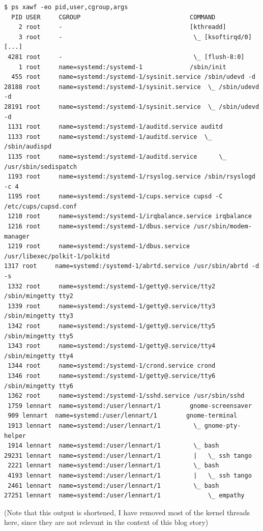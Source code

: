 \documentclass[titlepage]{article}
\begin{document}
\begin{lstlisting}
$ ps xawf -eo pid,user,cgroup,args
  PID USER     CGROUP                              COMMAND
    2 root     -                                   [kthreadd]
    3 root     -                                    \_ [ksoftirqd/0]
[...]
 4281 root     -                                    \_ [flush-8:0]
    1 root     name=systemd:/systemd-1             /sbin/init
  455 root     name=systemd:/systemd-1/sysinit.service /sbin/udevd -d
28188 root     name=systemd:/systemd-1/sysinit.service  \_ /sbin/udevd -d
28191 root     name=systemd:/systemd-1/sysinit.service  \_ /sbin/udevd -d
 1131 root     name=systemd:/systemd-1/auditd.service auditd
 1133 root     name=systemd:/systemd-1/auditd.service  \_ /sbin/audispd
 1135 root     name=systemd:/systemd-1/auditd.service      \_ /usr/sbin/sedispatch
 1193 root     name=systemd:/systemd-1/rsyslog.service /sbin/rsyslogd -c 4
 1195 root     name=systemd:/systemd-1/cups.service cupsd -C /etc/cups/cupsd.conf
 1210 root     name=systemd:/systemd-1/irqbalance.service irqbalance
 1216 root     name=systemd:/systemd-1/dbus.service /usr/sbin/modem-manager
 1219 root     name=systemd:/systemd-1/dbus.service /usr/libexec/polkit-1/polkitd
1317 root     name=systemd:/systemd-1/abrtd.service /usr/sbin/abrtd -d -s
 1332 root     name=systemd:/systemd-1/getty@.service/tty2 /sbin/mingetty tty2
 1339 root     name=systemd:/systemd-1/getty@.service/tty3 /sbin/mingetty tty3
 1342 root     name=systemd:/systemd-1/getty@.service/tty5 /sbin/mingetty tty5
 1343 root     name=systemd:/systemd-1/getty@.service/tty4 /sbin/mingetty tty4
 1344 root     name=systemd:/systemd-1/crond.service crond
 1346 root     name=systemd:/systemd-1/getty@.service/tty6 /sbin/mingetty tty6
 1362 root     name=systemd:/systemd-1/sshd.service /usr/sbin/sshd
 1759 lennart  name=systemd:/user/lennart/1        gnome-screensaver
 909 lennart  name=systemd:/user/lennart/1        gnome-terminal
 1913 lennart  name=systemd:/user/lennart/1         \_ gnome-pty-helper
 1914 lennart  name=systemd:/user/lennart/1         \_ bash
29231 lennart  name=systemd:/user/lennart/1         |   \_ ssh tango
 2221 lennart  name=systemd:/user/lennart/1         \_ bash
 4193 lennart  name=systemd:/user/lennart/1         |   \_ ssh tango
 2461 lennart  name=systemd:/user/lennart/1         \_ bash
27251 lennart  name=systemd:/user/lennart/1             \_ empathy
\end{lstlisting}
(Note that this output is shortened, I have removed most of the kernel threads here, since they are not relevant in the context of this blog story)
\end{document}
